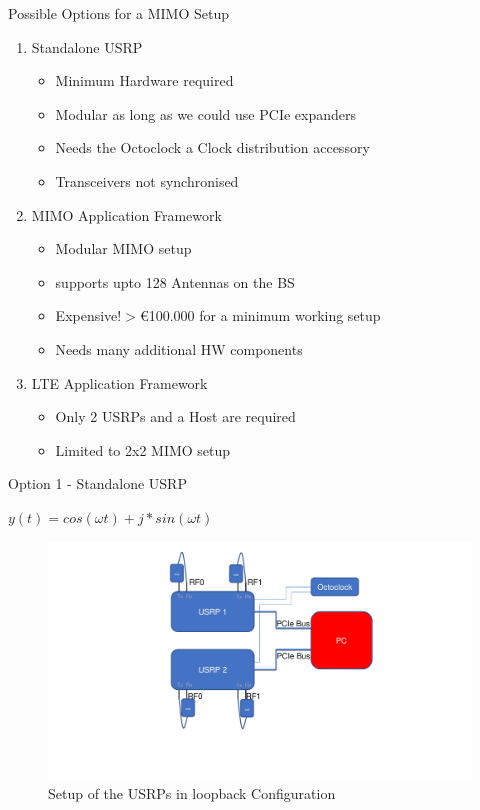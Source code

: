 \documentclass[10pt,t]{beamer}
\newcommand*\tick{\item[\textcolor{green}{\Checkmark}]}
\newcommand*\fail{\item[\textcolor{red}{\XSolidBrush}]}
\begin{document}
\begin{frame}{Possible Options for a MIMO Setup}
    \begin{enumerate}
        \item Standalone USRP
            \pause
            \begin{itemize}
                    \tick Minimum Hardware required
                    \tick Modular as long as we could use PCIe expanders
                    \fail Needs the Octoclock a Clock distribution accessory
                    \fail Transceivers not synchronised
            \end{itemize}
            \pause
        \item MIMO Application Framework
            \pause
            \begin{itemize}
                    \tick Modular MIMO setup
                    \tick supports upto 128 Antennas on the BS
                    \fail Expensive$! >$\euro100.000 for a minimum working setup
                    \fail Needs many additional HW components
            \end{itemize}
            \pause
        \item LTE Application Framework
            \pause
            \begin{itemize}
                    \tick Only 2 USRPs and a Host are required
                    \fail Limited to 2x2 MIMO setup
            \end{itemize}
    \end{enumerate}

\end{frame}

\begin{frame}{Option 1 - Standalone USRP}
    \pause
    \begin{center}
        $
        y(t) = cos(\omega{t}) + j*sin(\omega{t})
        $
    \end{center}
    \begin{figure}[H]
        \centering
        \includegraphics[width=0.9\linewidth]{../images/SetUpIllustration.pdf}
        \caption{Setup of the USRPs in loopback Configuration}
        \label{fig:SyncFail2Ch}%
    \end{figure}
\end{frame}
\end{document}

